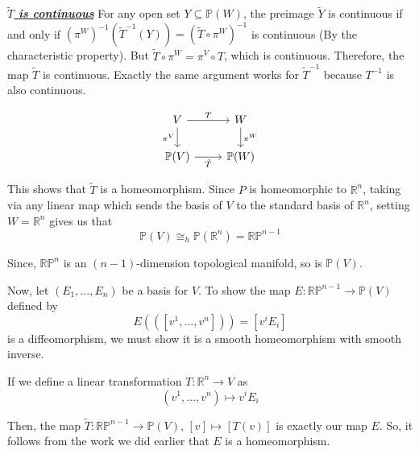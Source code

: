 \documentclass{article}
\newcommand{\bP}{\mathbb{P}}
\newcommand{\R}{\mathbb{R}}
\begin{document}
\vskip 0.25cm
\underline{\emph{\textbf{$\tilde{T}$ is continuous}}}
For any open set $Y \subseteq \bP(W)$, the preimage $\tilde{Y}$ is continuous if and only if $(\pi^W)^{-1}(\tilde{T}^{-1}(Y)) = \left( \tilde{T} \circ \pi^{W} \right)^{-1}$ is continuous (By the characteristic property). But $\tilde{T} \circ \pi^{W} = \pi^{V} \circ T$, which is continuous. Therefore, the map $\tilde{T}$ is continuous. Exactly the same argument works for $\tilde{T}^{-1}$ because $T^{-1}$ is also continuous.

\[\begin{tikzcd}
	V & W \\
	{\mathbb{P}(V)} & {\mathbb{P}(W)}
	\arrow["{\pi^{V}}"', from=1-1, to=2-1]
	\arrow["{\tilde{T}}"', from=2-1, to=2-2]
	\arrow["{\pi^{W}}", from=1-2, to=2-2]
	\arrow["T", from=1-1, to=1-2]
\end{tikzcd}\]

This shows that $\tilde{T}$ is a homeomorphism. Since $P$ is homeomorphic to $\R^n$, taking via any linear map which sends the basis of $V$ to the standard basis of $\R^n$, setting $W = \R^n$ gives us that 
\[ \bP(V) \cong_{h} \bP(\R^n) = \mathbb{RP}^{n-1} \]

Since, $\mathbb{RP}^{n}$ is an $(n-1)$-dimension topological manifold, so is $\bP(V)$.

Now, let $(E_1, \dots, E_n)$ be a basis for $V$. To show the map $E : \mathbb{RP}^{n-1} \rightarrow \bP(V)$ defined by 
\[ E(\left( [v^1, \dots, v^n] \right)) = [v^i E_i]\]
is a diffeomorphism, we must show it is a smooth homeomorphism with smooth inverse.

If we define a linear transformation $T : \mathbb{R}^n \rightarrow V$ as 
\[ (v^1, \dots, v^n) \mapsto v^i E_i  \] 

Then, the map $\tilde{T} : \mathbb{RP}^{n-1} \rightarrow \bP(V) $, $[v] \mapsto [T(v)]$ is exactly our map $E$. So, it follows from the work we did earlier that $E$ is a homeomorphism. 

\vskip 0.25cm

\end{document}

